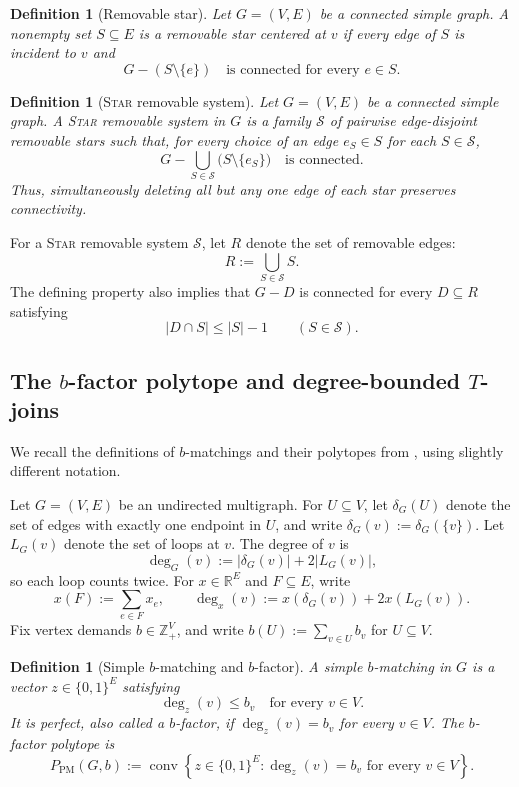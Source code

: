 \documentclass[11pt]{amsart}
\newcommand{\1}{\mathbbm{1}}
\newtheorem{definition}[theorem]{Definition}
\begin{document}
\begin{definition}[Removable star]
Let $G=(V,E)$ be a connected simple graph.
A nonempty set $S\subseteq E$ is a \emph{removable star centered at $v$}
if every edge of $S$ is incident to $v$ and
\[
    G-(S\setminus\{e\})
    \quad\text{is connected for every }e\in S.
\]
\end{definition}

\begin{definition}[\textsc{Star} removable system]

Let $G=(V,E)$ be a connected simple graph.
A \emph{\textsc{Star} removable system} in $G$ is a family $\mathcal{S}$
of pairwise edge-disjoint removable stars such that, for every
choice of an edge $e_S\in S$ for each $S\in\mathcal{S}$,
\[
    G-\bigcup_{S\in\mathcal{S}}
    \bigl(S\setminus\{e_S\}\bigr)
    \quad\text{is connected}.
\]
Thus, simultaneously deleting all but any one edge of each star
preserves connectivity.
\end{definition}

For a \textsc{Star} removable system $\mathcal{S}$, let $R$ denote the set of removable edges:
\[
    R:=\bigcup_{S\in\mathcal{S}}S.
\]
The defining property also implies that $G-D$ is connected
for every $D\subseteq R$ satisfying
\[
    |D\cap S|\le |S|-1
    \qquad(S\in\mathcal{S}).
\]

\subsection{The \texorpdfstring{$b$}{b}-factor polytope and degree-bounded \texorpdfstring{$T$}{T}-joins}

We recall the definitions of $b$-matchings and their polytopes
from \cite{Schrijver2003}, using slightly different notation.

Let $G=(V,E)$ be an undirected multigraph. For $U\subseteq V$,
let $\delta_G(U)$ denote the set of edges with exactly one endpoint
in $U$, and write $\delta_G(v):=\delta_G(\{v\})$.
Let $L_G(v)$ denote the set of loops at $v$. The degree of $v$ is
\[
    \deg_G(v):=|\delta_G(v)|+2|L_G(v)|,
\]
so each loop counts twice.
For $x\in\mathbb{R}^{E}$ and $F\subseteq E$, write
\[
    x(F):=\sum_{e\in F}x_e,
    \qquad
    \deg_x(v):=x(\delta_G(v))+2x(L_G(v)).
\]
Fix vertex demands $b\in\mathbb{Z}_{+}^{V}$, and write
$b(U):=\sum_{v\in U}b_v$ for $U\subseteq V$.

\begin{definition}[Simple $b$-matching and $b$-factor]
A \emph{simple $b$-matching} in $G$ is a vector
$z\in\{0,1\}^{E}$ satisfying
\[
    \deg_z(v)\le b_v
    \quad\text{for every }v\in V.
\]
It is \emph{perfect}, also called a \emph{$b$-factor}, if
$\deg_z(v)=b_v$ for every $v\in V$.
The \emph{$b$-factor polytope} is
\[
    P_{\mathrm{PM}}(G,b)
    :=
    \operatorname{conv}
    \left\{
        z\in\{0,1\}^{E}:
        \deg_z(v)=b_v\text{ for every }v\in V
    \right\}.
\]
\end{definition}
\end{document}

